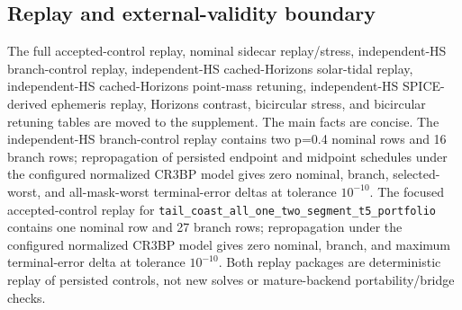 \documentclass[preprint,12pt]{elsarticle}
\begin{document}
\begin{table}[t]
\centering
\caption{Fixed-final-time tail-coast locked-nominal hard-catalog recovery. The combined row selects/evaluates all 27 configured one- and two-segment masks in one fixed-final-time case row; separate all-single and all-two-segment rows are retained as provenance/scope rows. Branches with post-outage recovery variables are optimized. No-recovery-variable late-tail branches are direct threshold evaluations, so false branch optimizer all-success flags are accounting caveats rather than threshold failures.}
\label{tab:tail_coast_recovery}
\resizebox{\textwidth}{!}{}
\end{table}

\subsection{Replay and external-validity boundary}

The full accepted-control replay, nominal sidecar replay/stress, independent-HS branch-control replay, independent-HS cached-Horizons solar-tidal replay, independent-HS cached-Horizons point-mass retuning, independent-HS SPICE-derived ephemeris replay, Horizons contrast, bicircular stress, and bicircular retuning tables are moved to the supplement. The main facts are concise. The independent-HS branch-control replay contains two p=0.4 nominal rows and 16 branch rows; repropagation of persisted endpoint and midpoint schedules under the configured normalized CR3BP model gives zero nominal, branch, selected-worst, and all-mask-worst terminal-error deltas at tolerance $10^{-10}$. The focused accepted-control replay for \texttt{tail\_coast\_all\_one\_two\_segment\_t5\_portfolio} contains one nominal row and 27 branch rows; repropagation under the configured normalized CR3BP model gives zero nominal, branch, and maximum terminal-error delta at tolerance $10^{-10}$. Both replay packages are deterministic replay of persisted controls, not new solves or mature-backend portability/bridge checks.
\end{document}
